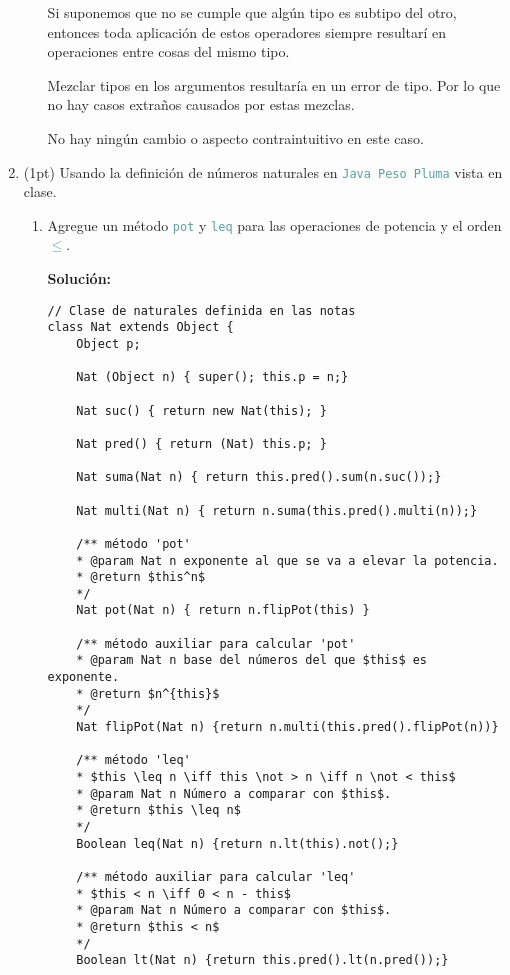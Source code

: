 \documentclass{article}
\newcommand{\tp}[1]{\textcolor{CadetBlue} {\texttt{#1}}}
\newcommand{\tb}[1]{\textcolor{RoyalPurple} {\textbf{#1}}}
\newcommand{\pt}[1]{\textcolor{RoyalPurple}{(#1pt)}}
\begin{document}
\begin{enumerate}
\begin{itemize}
            Si suponemos que no se cumple que algún tipo es subtipo del otro,
            entonces toda aplicación de estos operadores siempre resultarí en 
            operaciones entre cosas del mismo tipo.

            Mezclar tipos en los argumentos resultaría en un error de tipo. Por
            lo que no hay casos extraños causados por estas mezclas.

            No hay ningún cambio o aspecto contraintuitivo en este caso.

        \end{itemize}

        \item \pt{1} Usando la definición de números naturales en
        \tp{Java Peso Pluma} vista en clase.

        \begin{enumerate}
            \item Agregue un método \tp{pot} y \tp{leq} para las operaciones de
            potencia y el orden \tp{$\leq$}.

            \tb{Solución:}

            \begin{verbatim}
// Clase de naturales definida en las notas
class Nat extends Object {
    Object p;

    Nat (Object n) { super(); this.p = n;}

    Nat suc() { return new Nat(this); }

    Nat pred() { return (Nat) this.p; }

    Nat suma(Nat n) { return this.pred().sum(n.suc());}

    Nat multi(Nat n) { return n.suma(this.pred().multi(n));}

    /** método 'pot'
    * @param Nat n exponente al que se va a elevar la potencia.
    * @return $this^n$
    */
    Nat pot(Nat n) { return n.flipPot(this) }

    /** método auxiliar para calcular 'pot'
    * @param Nat n base del números del que $this$ es exponente.
    * @return $n^{this}$
    */
    Nat flipPot(Nat n) {return n.multi(this.pred().flipPot(n))}

    /** método 'leq'
    * $this \leq n \iff this \not > n \iff n \not < this$
    * @param Nat n Número a comparar con $this$.
    * @return $this \leq n$
    */
    Boolean leq(Nat n) {return n.lt(this).not();}

    /** método auxiliar para calcular 'leq'
    * $this < n \iff 0 < n - this$
    * @param Nat n Número a comparar con $this$.
    * @return $this < n$
    */
    Boolean lt(Nat n) {return this.pred().lt(n.pred());}


\end{verbatim}
\end{enumerate}
\end{enumerate}
\end{document}
